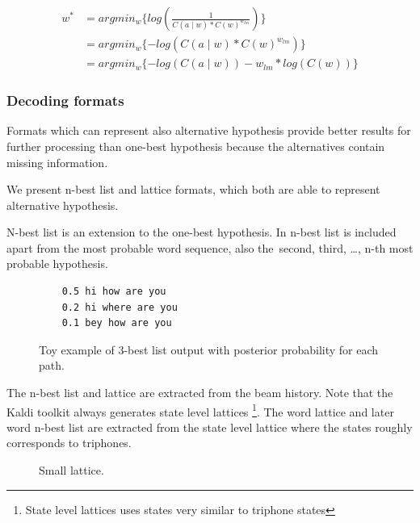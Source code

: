 {\begin{equation}\label{eq:am_lm_log}
    \begin{split}
        w^* &= argmin_{w}\{log(\frac{1}{C(a \mid w) * C(w)^{w_{lm}}})\} \\
        &= argmin_{w}\{-log(C(a \mid w) * C(w)^{w_{lm}})\} \\
        &= argmin_{w}\{-log(C(a \mid w)) - w_{lm}*log( C(w))\} 
    \end{split}
\end{equation}

\subsubsection*{Decoding formats}
Formats which can represent also alternative hypothesis provide better results for further processing than one-best hypothesis because the alternatives contain missing information.

We present n-best list and lattice formats, which both are able to represent alternative hypothesis.

N-best list is an extension to the one-best hypothesis. 
In n-best list is included apart from the most probable word sequence, also the~second, third, \ldots, n-th most probable hypothesis. 

\begin{figure}[!htp]
    \begin{center}
\begin{verbatim}
    0.5 hi how are you
    0.2 hi where are you
    0.1 bey how are you
\end{verbatim}
    \caption{Toy example of 3-best list output with posterior probability for each path.}
    \label{fig:nbest} 
    \end{center}
\end{figure}

The n-best list and lattice are extracted from the beam history.
Note that the Kaldi toolkit always generates state level lattices \cite{povey2012generating}\footnote{State level lattices uses states very similar to triphone states}. 
The word lattice and later word n-best list are extracted from the state level lattice where the states roughly corresponds to triphones. 

\begin{figure}[!htp]
    \begin{center}
    
    \caption{Small lattice. }
    \label{fig:toy_lat} 
    \end{center}
\end{figure}

}
